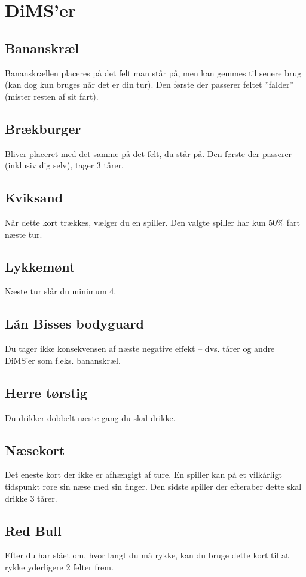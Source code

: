 \documentclass{article}
\begin{document}
\section{DiMS'er}

\subsection{Bananskræl} 
Bananskrællen placeres på det felt man står på, men kan gemmes til senere brug (kan dog kun bruges når det er din tur). Den første der passerer feltet ”falder” (mister resten af sit fart).
 
\subsection{Brækburger} 
Bliver placeret med det samme på det felt, du står på. Den første der passerer (inklusiv dig selv), tager 3 tårer.
 
\subsection{Kviksand} 
Når dette kort trækkes, vælger du en spiller. Den valgte spiller har kun 50\% fart næste tur.
 
\subsection{Lykkemønt} 
Næste tur slår du minimum 4.
 
\subsection{Lån Bisses bodyguard} 
Du tager ikke konsekvensen af næste negative effekt – dvs. tårer og andre DiMS'er som f.eks. bananskræl.
 
\subsection{Herre tørstig}
Du drikker dobbelt næste gang du skal drikke.
 
\subsection{Næsekort} 
Det eneste kort der ikke er afhængigt af ture. En spiller kan på et vilkårligt tidspunkt røre sin næse med sin finger. Den sidste spiller der efteraber dette skal drikke 3 tårer.
 
\subsection{Red Bull} 
Efter du har slået om, hvor langt du må rykke, kan du bruge dette kort til at rykke yderligere 2 felter frem.
 
\end{document}
